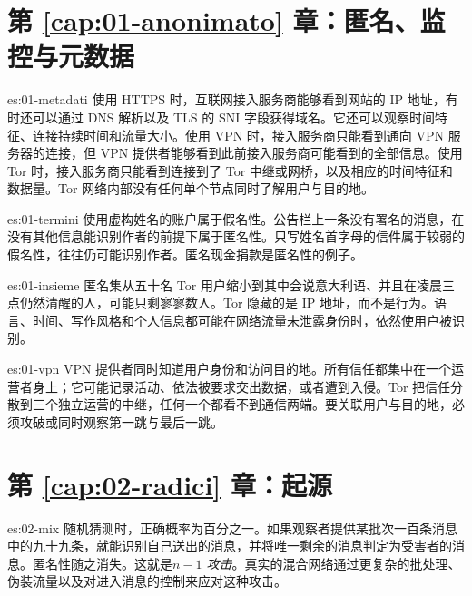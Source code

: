 \section*{第 \ref{cap:01-anonimato} 章：匿名、监控与元数据}

\begin{soluzione}{es:01-metadati}
使用 HTTPS 时，互联网接入服务商能够看到网站的 IP 地址，有时还可以通过 DNS 解析以及 TLS 的 SNI 字段获得域名。它还可以观察时间特征、连接持续时间和流量大小。使用 VPN 时，接入服务商只能看到通向 VPN 服务器的连接，但 VPN 提供者能够看到此前接入服务商可能看到的全部信息。使用 Tor 时，接入服务商只能看到连接到了 Tor 中继或网桥，以及相应的时间特征和数据量。Tor 网络内部没有任何单个节点同时了解用户与目的地。
\end{soluzione}

\begin{soluzione}{es:01-termini}
使用虚构姓名的账户属于假名性。公告栏上一条没有署名的消息，在没有其他信息能识别作者的前提下属于匿名性。只写姓名首字母的信件属于较弱的假名性，往往仍可能识别作者。匿名现金捐款是匿名性的例子。
\end{soluzione}

\begin{soluzione}{es:01-insieme}
匿名集从五十名 Tor 用户缩小到其中会说意大利语、并且在凌晨三点仍然清醒的人，可能只剩寥寥数人。Tor 隐藏的是 IP 地址，而不是行为。语言、时间、写作风格和个人信息都可能在网络流量未泄露身份时，依然使用户被识别。
\end{soluzione}

\begin{soluzione}{es:01-vpn}
VPN 提供者同时知道用户身份和访问目的地。所有信任都集中在一个运营者身上；它可能记录活动、依法被要求交出数据，或者遭到入侵。Tor 把信任分散到三个独立运营的中继，任何一个都看不到通信两端。要关联用户与目的地，必须攻破或同时观察第一跳与最后一跳。
\end{soluzione}

\section*{第 \ref{cap:02-radici} 章：起源}

\begin{soluzione}{es:02-mix}
随机猜测时，正确概率为百分之一。如果观察者提供某批次一百条消息中的九十九条，就能识别自己送出的消息，并将唯一剩余的消息判定为受害者的消息。匿名性随之消失。这就是\emph{$n-1$ 攻击}。真实的混合网络通过更复杂的批处理、伪装流量以及对进入消息的控制来应对这种攻击。
\end{soluzione}

